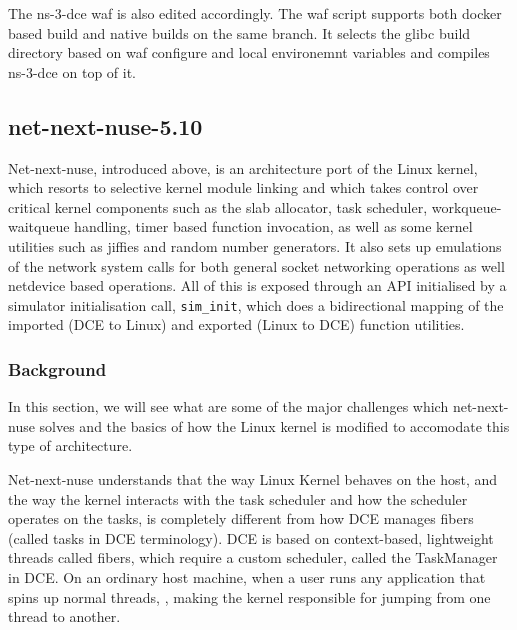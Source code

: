 \documentclass{sig-alternate}
\begin{document}
The ns-3-dce waf is also edited accordingly. The waf script supports both docker based build and native builds on the same branch. It selects the glibc 
build directory based on waf configure and local environemnt variables and compiles ns-3-dce on top of it.

\subsection{net-next-nuse-5.10}
Net-next-nuse, introduced above, is an architecture port of the Linux kernel, which resorts to selective kernel module linking and which takes control over critical kernel 
components such as the slab allocator, task scheduler, workqueue-waitqueue handling, timer based function invocation, as well as some kernel 
utilities such as jiffies and random number generators. It also sets up emulations of the network system calls for both general socket networking 
operations as well netdevice based operations. All of this is exposed through an API initialised by a simulator initialisation call, \texttt{sim\_init}, 
which does a bidirectional mapping of the imported (DCE to Linux) and exported (Linux to DCE) function utilities.

\subsubsection{Background}
In this section, we will see what are some of the major challenges which net-next-nuse solves and the basics of how the Linux kernel is modified to 
accomodate this type of architecture.

Net-next-nuse understands that the way Linux Kernel behaves on the host, and the way the kernel interacts with the task 
scheduler and how the scheduler operates on the tasks, is completely different from how DCE manages fibers (called tasks in DCE terminology). 
DCE is based on context-based, lightweight threads called fibers, which require a custom scheduler, called the TaskManager in DCE. On an ordinary
host machine, when a user runs any application that spins up normal threads, , making the kernel responsible for jumping from one thread to another. 
\end{document}
